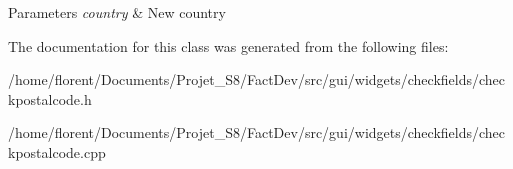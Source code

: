 \begin{DoxyParams}{Parameters}
{\em country} & New country \\
\hline
\end{DoxyParams}


The documentation for this class was generated from the following files\-:\begin{DoxyCompactItemize}
\item 
/home/florent/\-Documents/\-Projet\-\_\-\-S8/\-Fact\-Dev/src/gui/widgets/checkfields/checkpostalcode.\-h\item 
/home/florent/\-Documents/\-Projet\-\_\-\-S8/\-Fact\-Dev/src/gui/widgets/checkfields/checkpostalcode.\-cpp\end{DoxyCompactItemize}
